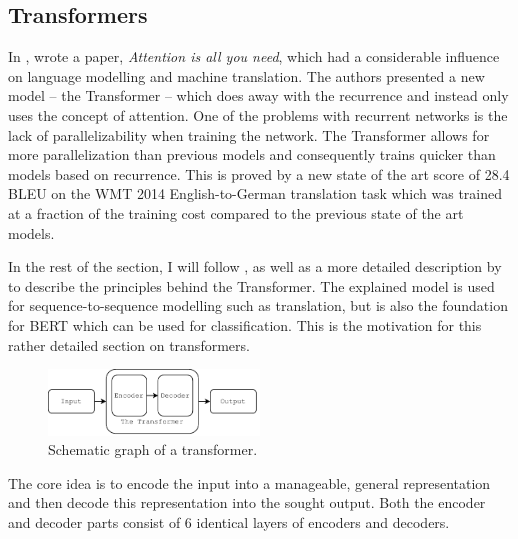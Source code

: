 \subsection{Transformers}\label{sec:trfmod}
In \citeyear{NIPS2017_7181}, \citeauthor{NIPS2017_7181} wrote a paper, \textit{Attention is all you need}, which had a considerable influence on language modelling and machine translation. The authors presented a new model -- the Transformer -- which does away with the recurrence and instead only uses the concept of attention. One of the problems with recurrent networks is the lack of parallelizability when training the network. The Transformer allows for more parallelization than previous models and consequently trains quicker than models based on recurrence. This is proved by a new state of the art score of 28.4 BLEU on the WMT 2014 English-to-German translation task which was trained at a fraction of the training cost compared to the previous state of the art models. 


In the rest of the section, I will follow \citet{NIPS2017_7181}, as well as a more detailed description by \citet{jayalammar2018} to describe the principles behind the Transformer. The explained model is used for sequence-to-sequence modelling such as translation, but is also the foundation for BERT which can be used for classification. This is the motivation for this rather detailed section on transformers. 

\begin{figure}[ht]
    \centering
    \includegraphics[width=0.5\textwidth]{Figures/figs-transformer.pdf}
    \caption{Schematic graph of a transformer.}
    \label{fig:trfo}
\end{figure}

The core idea is to encode the input into a manageable, general representation and then decode this representation into the sought output. Both the encoder and decoder parts consist of 6 identical layers of encoders and decoders.

